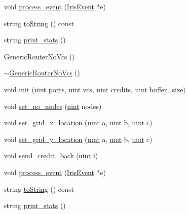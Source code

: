 \begin{CompactItemize}
\item 
void \hyperlink{classGenericRouterNoVcs_a2c52d53e127c9a3a029194e77f9f80c}{process\_\-event} (\hyperlink{classIrisEvent}{IrisEvent} $\ast$e)
\item 
string \hyperlink{classGenericRouterNoVcs_59307c319fbca5732d750630be9ee27c}{toString} () const 
\item 
string \hyperlink{classGenericRouterNoVcs_897a642767b5ecf17ec45220d201b7e6}{print\_\-stats} ()
\item 
\hyperlink{classGenericRouterNoVcs_0c9d450ec65aa82e1f82d20b3d7c66e1}{GenericRouterNoVcs} ()
\item 
\hyperlink{classGenericRouterNoVcs_25aa63b54decdffddb9bfd2da7759c4b}{$\sim$GenericRouterNoVcs} ()
\item 
void \hyperlink{classGenericRouterNoVcs_d0abf72a39438d7b23b9b03029d75da2}{init} (\hyperlink{outputBuffer_8h_91ad9478d81a7aaf2593e8d9c3d06a14}{uint} \hyperlink{classRouter_fd8e8adaf03e17b3fdbf7adc758c8f48}{ports}, \hyperlink{outputBuffer_8h_91ad9478d81a7aaf2593e8d9c3d06a14}{uint} \hyperlink{classRouter_ebaf2bc63bd99effe6520f9718120a1e}{vcs}, \hyperlink{outputBuffer_8h_91ad9478d81a7aaf2593e8d9c3d06a14}{uint} \hyperlink{classRouter_d747f5b948a9ef1497de6d4bb97b8f03}{credits}, \hyperlink{outputBuffer_8h_91ad9478d81a7aaf2593e8d9c3d06a14}{uint} \hyperlink{classRouter_b456618374083b8f2ec3c8e889d45bac}{buffer\_\-size})
\item 
void \hyperlink{classGenericRouterNoVcs_877a1b3fac555ef48ad7690429b2be28}{set\_\-no\_\-nodes} (\hyperlink{outputBuffer_8h_91ad9478d81a7aaf2593e8d9c3d06a14}{uint} nodes)
\item 
void \hyperlink{classGenericRouterNoVcs_9a0bc9c779518e5564bb25c0a3867434}{set\_\-grid\_\-x\_\-location} (\hyperlink{outputBuffer_8h_91ad9478d81a7aaf2593e8d9c3d06a14}{uint} a, \hyperlink{outputBuffer_8h_91ad9478d81a7aaf2593e8d9c3d06a14}{uint} b, \hyperlink{outputBuffer_8h_91ad9478d81a7aaf2593e8d9c3d06a14}{uint} c)
\item 
void \hyperlink{classGenericRouterNoVcs_30fb743466538fcf9d158ffa665f9ca2}{set\_\-grid\_\-y\_\-location} (\hyperlink{outputBuffer_8h_91ad9478d81a7aaf2593e8d9c3d06a14}{uint} a, \hyperlink{outputBuffer_8h_91ad9478d81a7aaf2593e8d9c3d06a14}{uint} b, \hyperlink{outputBuffer_8h_91ad9478d81a7aaf2593e8d9c3d06a14}{uint} c)
\item 
void \hyperlink{classGenericRouterNoVcs_f8bd205f15bb6ef680e1af859950f3d9}{send\_\-credit\_\-back} (\hyperlink{outputBuffer_8h_91ad9478d81a7aaf2593e8d9c3d06a14}{uint} i)
\item 
void \hyperlink{classGenericRouterNoVcs_a2c52d53e127c9a3a029194e77f9f80c}{process\_\-event} (\hyperlink{classIrisEvent}{IrisEvent} $\ast$e)
\item 
string \hyperlink{classGenericRouterNoVcs_59307c319fbca5732d750630be9ee27c}{toString} () const 
\item 
string \hyperlink{classGenericRouterNoVcs_897a642767b5ecf17ec45220d201b7e6}{print\_\-stats} ()
\end{CompactItemize}
